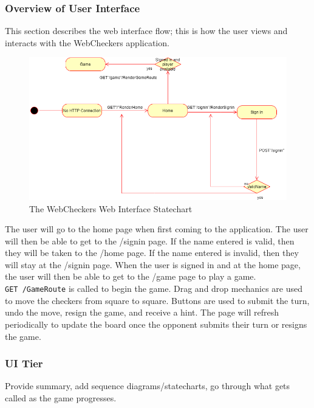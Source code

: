 \hypertarget{overview-of-user-interface}{%
\subsubsection{Overview of User
Interface}\label{overview-of-user-interface}}

This section describes the web interface flow; this is how the user
views and interacts with the WebCheckers application.

\begin{figure}[H]
\centering
\includegraphics{web-interface.png}
\caption{The WebCheckers Web Interface Statechart}
\end{figure}

The user will go to the home page when first coming to the application.
The user will then be able to get to the /signin page. If the name
entered is valid, then they will be taken to the /home page. If the name
entered is invalid, then they will stay at the /signin page. When the
user is signed in and at the home page, the user will then be able to
get to the /game page to play a game. \texttt{GET\ /GameRoute} is called
to begin the game. Drag and drop mechanics are used to move the checkers
from square to square. Buttons are used to submit the turn, undo the
move, resign the game, and receive a hint. The page will refresh
periodically to update the board once the opponent submits their turn or
resigns the game.

\hypertarget{ui-tier}{%
\subsubsection{UI Tier}\label{ui-tier}}

Provide summary, add sequence diagrams/statecharts, go through what gets
called as the game progresses.

